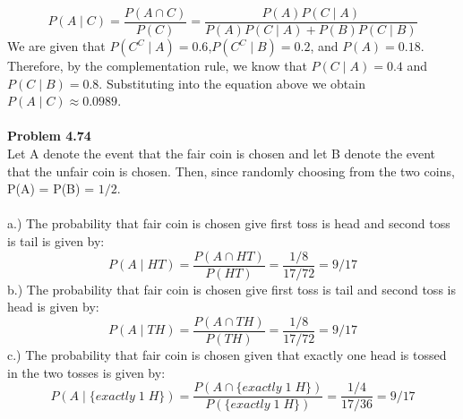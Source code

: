 \documentclass{article}
\begin{document}
$$P(A\mid\!C) = \frac{P(A\cap C)}{P(C)} = \frac{P(A)P(C\!\mid\!A)}{P(A)P(C\!\mid\!A)+P(B)P(C\!\mid\!B)}$$
We are given that $P(C^{C}\!\mid\!A)=0.6 $,$P(C^{C}\!\mid\!B)=0.2 $, and $P(A) = 0.18$. Therefore, by the complementation rule, we know that $P(C\!\mid\!A)=0.4 $ and $P(C\!\mid\!B)=0.8 $. Substituting into the equation above we obtain $P(A\!\mid\!C)\approx 0.0989$.
\\\\
\noindent\textbf{Problem 4.74}\\
Let A denote the event that the fair coin is chosen and let B denote the event that the unfair coin is chosen. Then, since randomly choosing from the two coins, P(A) = P(B) = $1/2$.
\\\\
a.) The probability that fair coin is chosen give first toss is head and second toss is tail is given by:
$$ P(A\!\mid\!HT) =  \frac{P(A\cap HT)}{P(HT)}=\frac{1/8}{17/72} = 9/17$$
b.) The probability that fair coin is chosen give first toss is tail and second toss is head is given by:
$$ P(A\!\mid\!TH) = \frac{P(A\cap TH)}{P(TH)}=\frac{1/8}{17/72} = 9/17$$
c.) The probability that fair coin is chosen given that exactly one head is tossed in the two tosses is given by:
$$ P(A\!\mid\!\{exactly \;1\; H\}) = \frac{P(A\cap \{exactly \;1\; H\})}{P(\{exactly \;1\; H\})}=\frac{1/4}{17/36} = 9/17 $$
\end{document}
